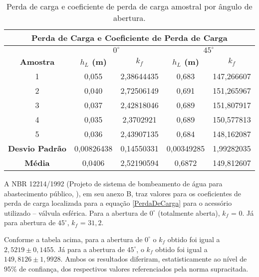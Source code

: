 \begin{table}[H]
\centering
\caption{Perda de carga e coeficiente de perda de carga amostral por ângulo de abertura.}
\label{t:kf}
\begin{tabular}{|c|c|c|c|c|}
\hline
\multicolumn{5}{|c|}{\textbf{Perda de Carga e Coeficiente de Perda de Carga}}                               \\ \hline
\textbf{}              & \multicolumn{2}{c|}{\textbf{$0^\circ$}} & \multicolumn{2}{c|}{\textbf{$45^\circ$}} \\ \hline
\textbf{Amostra}       & \textbf{$h_L$ (m)}   & \textbf{$k_f$}   & \textbf{$h_L$ (m)}    & \textbf{$k_f$}   \\ \hline
1                      & 0,055                & 2,38644435       & 0,683                 & 147,266607       \\ \hline
2                      & 0,040                & 2,72506149       & 0,691                 & 151,265967       \\ \hline
3                      & 0,037                & 2,42818046       & 0,689                 & 151,807917       \\ \hline
4                      & 0,035                & 2,3702921        & 0,689                 & 150,577813       \\ \hline
5                      & 0,036                & 2,43907135       & 0,684                 & 148,162087       \\ \hline
\textbf{Desvio Padrão} & 0,00826438           & 0,14550331       & 0,00349285            & 1,99282035       \\ \hline
\textbf{Média}         & 0,0406               & 2,52190594       & 0,6872                & 149,812607       \\ \hline
\end{tabular}
\end{table}

A NBR 12214/1992 (Projeto de sistema de bombeamento de água para abastecimento
público, \cite{NBR12214}), em seu anexo B, traz valores para os coeficientes de
perda de carga localizada para a equação \eqref{PerdaDeCarga} para o acessório
utilizado -- válvula esférica. Para a abertura de $0^\circ$ (totalmente aberta),
$k_f$ = 0. Já para abertura de $45^\circ$, $k_f$ = $31,2$.

Conforme a tabela acima, para a abertura de $0^\circ$ o $k_f$ obtido foi igual a
$2,5219 \pm 0,1455$. Já para a abertura de $45^\circ$, o $k_f$ obtido foi igual
a $149,8126 \pm 1,9928$. Ambos os resultados diferiram, estatisticamente ao
nível de 95\% de confiança, dos respectivos valores referenciados pela norma
supracitada.

